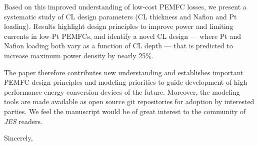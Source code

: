 \documentclass{letter} %
\begin{document}
\begin{letter}{ }
Based on this improved understanding of low-cost PEMFC losses, we present a systematic study of CL design parameters (CL thickness and Nafion and Pt loading). Results highlight design principles to improve power and limiting currents in low-Pt PEMFCs, and identify a novel CL design — where Pt and Nafion loading both vary as a function of CL depth — that is predicted to increase maximum power density by nearly 25\%.

The paper therefore contributes new understanding and establishes important PEMFC design principles and modeling priorities to guide development of high performance energy conversion devices of the future. Moreover, the modeling tools are made available as open source git repositories for adoption by interested parties. We feel the manuscript would be of great interest to the community of \emph{JES} readers.

\closing{Sincerely,\\[-0.5mm]
\\[1mm]

} 










\end{letter}
 
\end{document}
